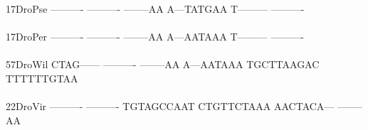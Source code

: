\documentclass[11pt,twoside,reqno,a4paper]{article}
\begin{document}
{17\hspace*{3\charwidth}DroPse	----------	----------	--------AA	A---TATGAA	T---------	----------	\\
\hspace*{5\charwidth}\hspace*{7\charwidth}\hspace*{1\charwidth}\hspace*{1\charwidth}\hspace*{1\charwidth}\hspace*{1\charwidth}\hspace*{1\charwidth}\hspace*{1\charwidth}\\
17\hspace*{3\charwidth}DroPer	----------	----------	--------AA	A---AATAAA	T---------	----------	\\
\hspace*{5\charwidth}\hspace*{7\charwidth}\hspace*{1\charwidth}\hspace*{1\charwidth}\hspace*{1\charwidth}\hspace*{1\charwidth}\hspace*{1\charwidth}\hspace*{1\charwidth}\\
57\hspace*{3\charwidth}DroWil	CTAG------	----------	--------AA	A---AATAAA	TGCTTAAGAC	TTTTTTGTAA	\\
\hspace*{5\charwidth}\hspace*{7\charwidth}\hspace*{1\charwidth}\hspace*{1\charwidth}\hspace*{1\charwidth}\hspace*{1\charwidth}\hspace*{1\charwidth}\hspace*{1\charwidth}\\
22\hspace*{3\charwidth}DroVir	----------	----------	TGTAGCCAAT	CTGTTCTAAA	AACTACA---	--------AA	\\
\hspace*{5\charwidth}\hspace*{7\charwidth}\hspace*{1\charwidth}\hspace*{1\charwidth}\hspace*{1\charwidth}\hspace*{1\charwidth}\hspace*{1\charwidth}\hspace*{1\charwidth}\\
}
\end{document}
